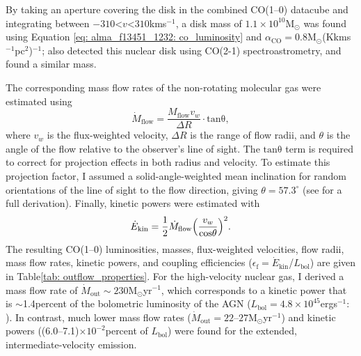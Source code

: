 By taking an aperture covering the disk in the combined CO(1--0) datacube and integrating between $-310$\;\textless\;$v$\;\textless\;$310$\;km\;s$^{-1}$, a disk mass of $1.1\times10^{10}$\;M$_\odot$ was found using Equation \ref{eq: alma_f13451_1232: co_luminosity} and $\alpha_\mathrm{CO}=0.8$\;M$_\odot$\;(K\;km\;s$^{-1}$\;pc$^2$)$^{-1}$; \citet{Lamperti2022} also detected this nuclear disk using CO(2-1) spectroastrometry, and found a similar mass.

The corresponding mass flow rates of the non-rotating molecular gas were estimated using
\begin{equation}
    \dot{M}_\mathrm{flow} = \frac{M_\mathrm{flow}v_w}{\Delta R} \cdot \mathrm{tan\theta},
\end{equation}
where $v_w$ is the flux-weighted velocity, $\Delta R$ is the range of flow radii, and $\theta$ is the angle of the flow relative to the observer's line of sight. The $\mathrm{tan\theta}$ term is required to correct for projection effects in both radius and velocity. To estimate this projection factor, I assumed a solid-angle-weighted mean inclination for random orientations of the line of sight to the flow direction, giving $\theta=57.3^\circ$ (see \citealt{Law2009} for a full derivation). Finally, kinetic powers were estimated with
\begin{equation}
    \dot{E}_\mathrm{kin}=\frac{1}{2}\dot{M}_\mathrm{flow}\Bigl(\frac{v_w}{\mathrm{cos\theta}}\Bigl)^2.
    \label{eq: alma_f13451_1232: kinetic_power}
\end{equation}
The resulting CO(1--0) luminosities, masses, flux-weighted velocities, flow radii, mass flow rates, kinetic powers, and coupling efficiencies ($\epsilon_\mathrm{f}=\dot{E}_\mathrm{kin}$/$L_\mathrm{bol}$) are given in Table\;\ref{tab: outflow_properties}. For the high-velocity nuclear gas, I derived a mass flow rate of $\dot{M}_\mathrm{out}\sim230$\;M$_\odot$\;yr$^{-1}$, which corresponds to a kinetic power that is $\sim$1.4\;per\;cent of the bolometric luminosity of the AGN ($L_\mathrm{bol}=4.8\times10^{45}$\;erg\;s$^{-1}$: \citealt{Rose2018}). In contrast, much lower mass flow rates ($\dot{M}_\mathrm{out}=22$--$27$\;M$_\odot$\;yr$^{-1}$) and kinetic powers ((6.0--7.1)$\times10^{-2}$\;per\;cent of $L_\mathrm{bol}$) were found for the extended, intermediate-velocity emission.


